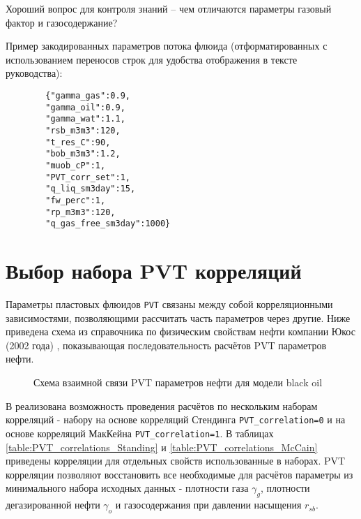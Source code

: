 Хороший вопрос для контроля знаний -- чем отличаются параметры газовый фактор и газосодержание?

Пример закодированных параметров потока флюида (отформатированных с использованием переносов строк для удобства отображения в тексте руководства):

\begin{verbatim} 
		{"gamma_gas":0.9,
		"gamma_oil":0.9,
		"gamma_wat":1.1,
		"rsb_m3m3":120,
		"t_res_C":90,
		"bob_m3m3":1.2,
		"muob_cP":1,
		"PVT_corr_set":1,
		"q_liq_sm3day":15,
		"fw_perc":1,
		"rp_m3m3":120,
		"q_gas_free_sm3day":1000}
\end{verbatim}

\section{Выбор набора PVT корреляций}
Параметры пластовых флюидов \texttt{PVT} связаны между собой корреляционными зависимостями, позволяющими рассчитать часть параметров через другие. Ниже приведена схема из справочника по физическим свойствам нефти компании Юкос (2002 года) \cite{Yukos_PVT_2002}, показывающая последовательность расчётов PVT параметров нефти.

\begin{figure}[H]
	\caption{Схема взаимной связи PVT параметров нефти для модели black oil \cite{Yukos_PVT_2002}}
	\label{ris:PVT_props}
\end{figure}

В \unf{} реализована возможность проведения расчётов по нескольким наборам корреляций - набору на основе корреляций Стендинга \texttt{PVT_correlation=0} и на основе корреляций МакКейна \texttt{PVT_correlation=1}. В таблицах \ref{table:PVT_correlations_Standing} и \ref{table:PVT_correlations_McCain} приведены корреляции для отдельных свойств использованные в наборах.  PVT корреляции позволяют восстановить все необходимые для расчётов параметры из минимального набора исходных данных - плотности газа $\gamma_g$, плотности дегазированной нефти $\gamma_o$ и газосодержания при давлении насыщения $r_{sb}$. 



